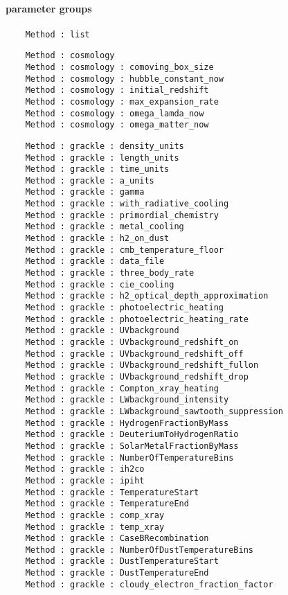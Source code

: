 \NEWSEC

\subsection{\ssParamMethod}

\begin{frame}[fragile,label=ss-param-method] 
\secframetitle{\ssParamMethod}
\framesubtitle{ parameter groups}

\begin{verbatim}
    Method : list
\end{verbatim}

\begin{verbatim}
    Method : cosmology
    Method : cosmology : comoving_box_size
    Method : cosmology : hubble_constant_now
    Method : cosmology : initial_redshift
    Method : cosmology : max_expansion_rate
    Method : cosmology : omega_lamda_now
    Method : cosmology : omega_matter_now
\end{verbatim}

\begin{verbatim}
    Method : grackle : density_units
    Method : grackle : length_units
    Method : grackle : time_units
    Method : grackle : a_units
    Method : grackle : gamma
    Method : grackle : with_radiative_cooling
    Method : grackle : primordial_chemistry
    Method : grackle : metal_cooling
    Method : grackle : h2_on_dust
    Method : grackle : cmb_temperature_floor
    Method : grackle : data_file
    Method : grackle : three_body_rate
    Method : grackle : cie_cooling
    Method : grackle : h2_optical_depth_approximation
    Method : grackle : photoelectric_heating
    Method : grackle : photoelectric_heating_rate
    Method : grackle : UVbackground
    Method : grackle : UVbackground_redshift_on
    Method : grackle : UVbackground_redshift_off
    Method : grackle : UVbackground_redshift_fullon
    Method : grackle : UVbackground_redshift_drop
    Method : grackle : Compton_xray_heating
    Method : grackle : LWbackground_intensity
    Method : grackle : LWbackground_sawtooth_suppression
    Method : grackle : HydrogenFractionByMass
    Method : grackle : DeuteriumToHydrogenRatio
    Method : grackle : SolarMetalFractionByMass
    Method : grackle : NumberOfTemperatureBins
    Method : grackle : ih2co
    Method : grackle : ipiht
    Method : grackle : TemperatureStart
    Method : grackle : TemperatureEnd
    Method : grackle : comp_xray
    Method : grackle : temp_xray
    Method : grackle : CaseBRecombination
    Method : grackle : NumberOfDustTemperatureBins
    Method : grackle : DustTemperatureStart
    Method : grackle : DustTemperatureEnd
    Method : grackle : cloudy_electron_fraction_factor
\end{verbatim}


\end{frame}
